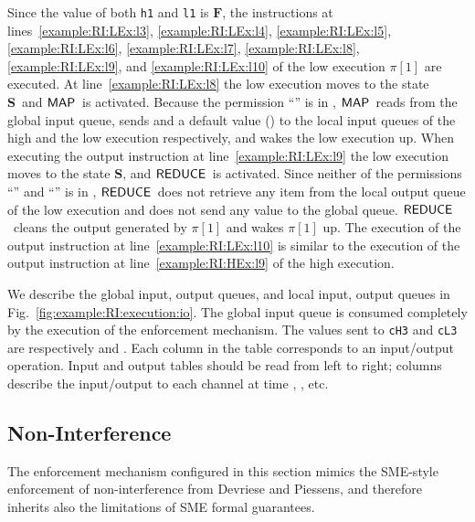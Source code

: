 \documentclass[10pt,a4paper,oneside]{article}
\def\sS{\textbf{S}}
\def\VFALSE{\ensuremath{\textbf{F}}}
\def\sanserif#1{\ensuremath{\sf #1}}
\def\REDUCE{\ensuremath{\sanserif{REDUCE}}}
\def\MAP{\ensuremath{\sanserif{MAP}}}
\def\Prog{\ensuremath{\pi}}
\def\Progl#1{\ensuremath{\Prog[#1]}}
\def\linecode#1{{\texttt{#1}}}
\begin{document}
Since the value of both \linecode{h1} and \linecode{l1} is \VFALSE, the instructions at lines~\ref{example:RI:LEx:l3}, \ref{example:RI:LEx:l4}, \ref{example:RI:LEx:l5}, \ref{example:RI:LEx:l6}, \ref{example:RI:LEx:l7}, \ref{example:RI:LEx:l8}, \ref{example:RI:LEx:l9}, and \ref{example:RI:LEx:l10} of the low execution \Progl{1} are executed. At line~\ref{example:RI:LEx:l8} the low execution moves to the state \sS\ and \MAP\ is activated. Because the permission ``'' is in , \MAP\ reads  from the global input queue, sends  and a default value () to the local input queues of the high and the low execution respectively, and wakes the low execution up. When executing the output instruction at line~\ref{example:RI:LEx:l9} the low execution moves to the state \sS, and \REDUCE\ is activated. Since neither of the permissions ``'' and ``'' is in , \REDUCE\ does not retrieve any item from the local output queue of the low execution and does not send any value to the global queue. \REDUCE\ cleans the output generated by \Progl{1} and wakes \Progl{1} up. The execution of the output instruction at line~\ref{example:RI:LEx:l10} is similar to the execution of the output instruction at line~\ref{example:RI:HEx:l9} of the high execution.

We describe the global input, output queues, and local input, output queues in Fig.~\ref{fig:example:RI:execution:io}. The global input queue is consumed completely by the execution of the enforcement mechanism. The values sent to \linecode{cH3} and \linecode{cL3} are respectively  and . Each column in the table corresponds to an input/output operation. Input and output tables should be read from left to right; columns describe the input/output to each channel at time , , etc.




\subsection{Non-Interference}\label{sec:em:NI}
The enforcement mechanism configured in this section mimics the SME-style enforcement of non-interference \cite{Devr-Pies-10-IEEESP} from Devriese and Piessens, and therefore inherits also the limitations of SME formal guarantees.
\end{document}
